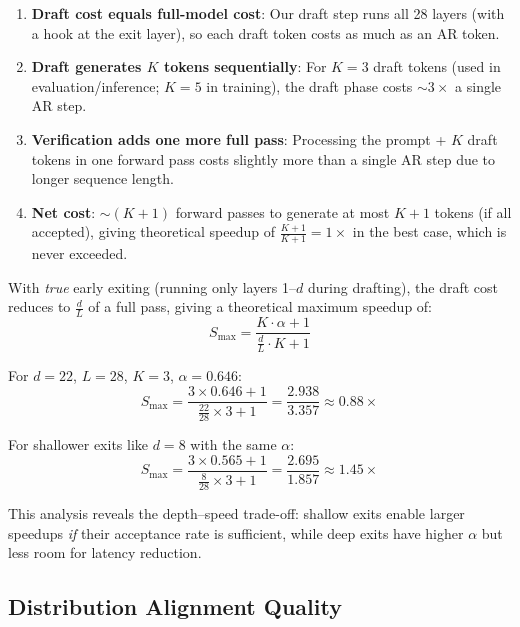 \documentclass[11pt]{article}
\begin{document}
\begin{enumerate}
    \item \textbf{Draft cost equals full-model cost}: Our draft step runs all 28 layers (with a hook at the exit layer), so each draft token costs as much as an AR token.
    \item \textbf{Draft generates $K$ tokens sequentially}: For $K = 3$ draft tokens (used in evaluation/inference; $K=5$ in training), the draft phase costs $\sim 3\times$ a single AR step.
    \item \textbf{Verification adds one more full pass}: Processing the prompt + $K$ draft tokens in one forward pass costs slightly more than a single AR step due to longer sequence length.
    \item \textbf{Net cost}: $\sim (K + 1)$ forward passes to generate at most $K + 1$ tokens (if all accepted), giving theoretical speedup of $\frac{K+1}{K+1} = 1\times$ in the best case, which is never exceeded.
\end{enumerate}

With \emph{true} early exiting (running only layers 1--$d$ during drafting), the draft cost reduces to $\frac{d}{L}$ of a full pass, giving a theoretical maximum speedup of:
\begin{equation}
    S_{\max} = \frac{K \cdot \alpha + 1}{\frac{d}{L} \cdot K + 1}
\end{equation}

For $d = 22$, $L = 28$, $K = 3$, $\alpha = 0.646$:
\begin{equation}
    S_{\max} = \frac{3 \times 0.646 + 1}{\frac{22}{28} \times 3 + 1} = \frac{2.938}{3.357} \approx 0.88\times
\end{equation}

For shallower exits like $d = 8$ with the same $\alpha$:
\begin{equation}
    S_{\max} = \frac{3 \times 0.565 + 1}{\frac{8}{28} \times 3 + 1} = \frac{2.695}{1.857} \approx 1.45\times
\end{equation}

This analysis reveals the depth--speed trade-off: shallow exits enable larger speedups \emph{if} their acceptance rate is sufficient, while deep exits have higher $\alpha$ but less room for latency reduction.

\subsection{Distribution Alignment Quality}
\end{document}
